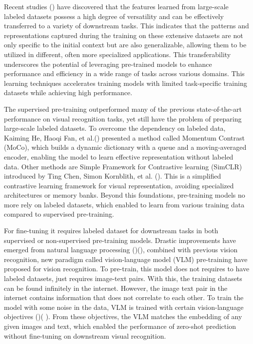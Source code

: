 Recent studies (\cite{radford2021learning}) have discovered that the features learned from large-scale labeled datasets possess a high degree of versatility and can be effectively transferred to a variety of downstream tasks. This indicates that the patterns and representations captured during the training on these extensive datasets are not only specific to the initial context but are also generalizable, allowing them to be utilized in different, often more specialized applications. This transferability underscores the potential of leveraging pre-trained models to enhance performance and efficiency in a wide range of tasks across various domains. 
This learning techniques accelerates training models with limited task-specific training datasets while achieving high performance.

The supervised pre-training outperformed many of the previous state-of-the-art performance on visual recognition tasks, yet still have the problem of preparing large-scale labeled datasets. To overcome the dependency on labeled data, Kaiming He, Haoqi Fan, et al.(\cite{he2020momentumcontrastunsupervisedvisual}) presented a method called Momentum Contrast (MoCo), which builds a dynamic dictionary with a queue and a moving-averaged encoder, enabling the model to learn effective representation without labeled data. Other methods are Simple Framework for Contrastive learning (SimCLR) introduced by Ting Chen, Simon Kornblith, et al. (\cite{chen2020simpleframeworkcontrastivelearning}). This is a simplified contrastive learning framework for visual representation, avoiding specialized architectures or memory banks. 
Beyond this foundations, pre-training models no more rely on labeled datasets, which enabled to learn from various training data compared to supervised pre-training. 

For fine-tuning it requires labeled dataset for downstream tasks in both supervised or non-supervised pre-training models. Drastic improvements have emerged from natural language processing (\cite{devlin2018bert})(\cite{brown2020language}), combined with previous vision recognition, new paradigm called vision-language model (VLM) pre-training have proposed for vision recognition. To pre-train, this model does not requires to have labeled datasets, just requires image-text pairs. With this, the training datasets can be found infinitely in the internet. However, the image text pair in the internet contains information that does not correlate to each other. To train the model with some noise in the data, VLM is trained with certain vision-language objectives (\cite{radford2021learning})( \cite{yu2022cocacontrastivecaptionersimagetext}). From these objectives, the VLM matches the embedding of any given images and text, which enabled the performance of zero-shot prediction without fine-tuning on downstream visual recognition.

